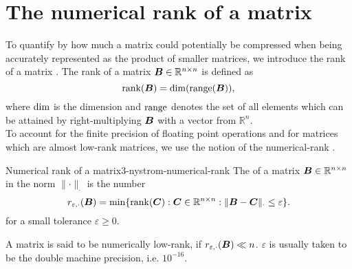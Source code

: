
\section{The numerical rank of a matrix}
\label{sec:3-nystrom-numerical-rank}

To quantify by how much a matrix could potentially be compressed when being accurately
represented as the product of smaller matrices, we introduce the rank of a
matrix \cite[section~III.3]{hefferon2012linear}.
The rank of a matrix $\boldsymbol{B} \in \mathbb{R}^{n \times n}$ is defined as
\begin{equation}
    \operatorname{rank}(\boldsymbol{B}) = \operatorname{dim}(\operatorname{range}(\boldsymbol{B})),
    \label{equ:3-nystrom-rank}
\end{equation}
where $\operatorname{dim}$ is the dimension and $\operatorname{range}$ denotes the set of all elements
which can be attained by right-multiplying $\boldsymbol{B}$ with a vector from $\mathbb{R}^n$.\\

To account for the finite precision of floating point operations
and for matrices which are almost low-rank matrices, we use the
notion of the \gls{numerical-rank} \cite[definition~1.1]{noga2013rank}.
\begin{definition}{Numerical rank of a matrix}{3-nystrom-numerical-rank}
    The  of a matrix $\boldsymbol{B} \in \mathbb{R}^{n \times n}$
    in the norm $\lVert \cdot \rVert _{\cdot}$ is the number
    \begin{equation}
        r_{\varepsilon, \cdot}(\boldsymbol{B}) = \min \{\operatorname{rank}(\boldsymbol{C}): \boldsymbol{C} \in \mathbb{R}^{n \times n}: \lVert \boldsymbol{B} - \boldsymbol{C} \rVert _{\cdot} \leq \varepsilon \}.
        \label{equ:3-nystrom-def-numerical-rank}
    \end{equation}
    for a small tolerance $\varepsilon \geq 0$.
\end{definition}%
A matrix is said to be numerically low-rank, if $r_{\varepsilon, \cdot}(\boldsymbol{B}) \ll n$.
$\varepsilon$ is usually taken to be the double machine precision, i.e. $10^{-16}$.\\

